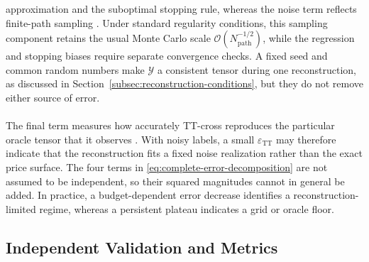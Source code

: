 \documentclass{article}
\numberwithin{equation}{subsection}
\theoremstyle{definition}
\theoremstyle{remark}
\begin{document}
approximation and the suboptimal stopping rule, whereas the noise term reflects
finite-path sampling \cite{longstaff2001leastSquares,glasserman2004montecarlo}.
Under standard regularity conditions, this sampling component retains the
usual Monte Carlo scale
\(\mathcal{O}(N_{\mathrm{path}}^{-1/2})\), while the regression and stopping
biases require separate convergence checks.
A fixed seed and common random numbers make \(\mathcal{Y}\) a consistent tensor
during one reconstruction, as discussed in
Section~\ref{subsec:reconstruction-conditions}, but they do not remove either
source of error.\\
\\
The final term measures how accurately TT-cross reproduces the particular
oracle tensor that it observes \cite{oseledets2010ttcross}. With noisy labels,
a small \(\varepsilon_{\mathrm{TT}}\) may therefore indicate that the
reconstruction fits a fixed noise realization rather than the exact price
surface. The four terms in \eqref{eq:complete-error-decomposition} are not
assumed to be independent, so their squared magnitudes cannot in general be
added. In practice, a budget-dependent error decrease identifies a
reconstruction-limited regime, whereas a persistent plateau indicates a grid
or oracle floor.
\subsection{Independent Validation and Metrics}
\label{subsec:validation-metrics}
\end{document}
